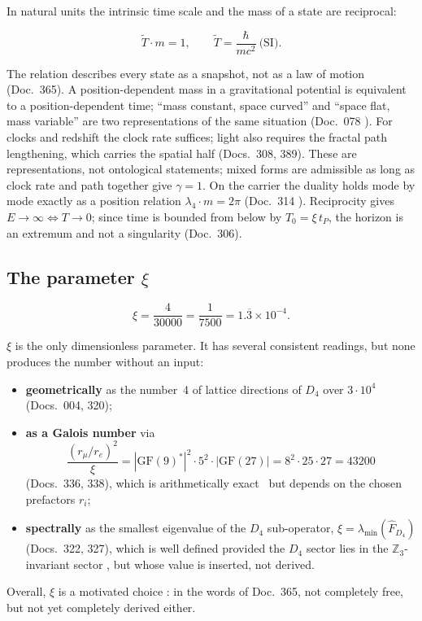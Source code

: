 In natural units the intrinsic time scale and the mass of a state are reciprocal:
\begin{ffkern}
\begin{equation}
  \tilde T\cdot m=1,\qquad \tilde T=\frac{\hbar}{mc^2}\ \text{(SI)}.
\end{equation}
\end{ffkern}%
The relation describes every state as a snapshot, not as a law of motion (Doc.~365). A
position-dependent mass in a gravitational potential is equivalent to a position-dependent time;
``mass constant, space curved'' and ``space flat, mass variable'' are two representations of the
same situation (Doc.~078 \KM). For clocks and redshift the clock rate suffices; light also
requires the fractal path lengthening, which carries the spatial half (Docs.~308, 389). These are
representations, not ontological statements; mixed forms are admissible as long as clock rate and
path together give $\gamma=1$. On the carrier the duality holds mode by mode exactly as a position
relation $\lambda_4\cdot m=2\pi$ (Doc.~314 \KM). Reciprocity gives
$E\to\infty\Leftrightarrow T\to0$; since time is bounded from below by $T_0=\xi\,t_P$, the
horizon is an extremum and not a singularity (Doc.~306).

\subsection{The parameter \texorpdfstring{$\xi$}{xi}}

\begin{ffkern}
\begin{equation}
  \xi=\frac{4}{30000}=\frac{1}{7500}=1.\overline{3}\times10^{-4}.
\end{equation}
\end{ffkern}%
$\xi$ is the only dimensionless parameter. It has several consistent readings, but none produces
the number without an input:
\begin{itemize}[leftmargin=*,itemsep=2pt]
\item \textbf{geometrically} as the number~4 of lattice directions of $D_4$ over $3\cdot10^4$
  (Docs.~004, 320);
\item \textbf{as a Galois number} via
\begin{equation}
  \frac{(r_\mu/r_e)^2}{\xi}=|\mathrm{GF}(9)^*|^2\cdot5^2\cdot|\mathrm{GF}(27)|=8^2\cdot25\cdot27=43200
\end{equation}
(Docs.~336, 338), which is arithmetically exact \BM\ but depends on the chosen prefactors $r_i$;
\item \textbf{spectrally} as the smallest eigenvalue of the $D_4$ sub-operator,
  $\xi=\lambda_{\min}(\hat F_{D_4})$ (Docs.~322, 327), which is well defined provided the $D_4$
  sector lies in the $\mathbb Z_3$-invariant sector \BM, but whose value is inserted, not derived.
\end{itemize}
Overall, $\xi$ is a motivated choice \SM: in
the words of Doc.~365, not completely free, but not yet completely derived either.

